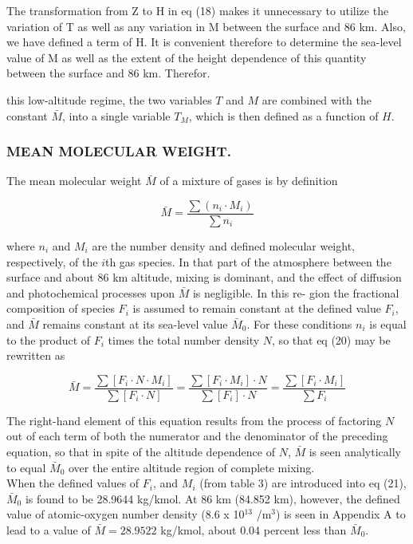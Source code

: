 \documentclass{article}
\begin{document}
The transformation from Z to H in eq (18) makes it unnecessary to utilize the variation of T as well as any variation in M between the surface and 86 km. Also, we have defined a term of H. It is convenient therefore to determine the sea-level value of M as well as the extent of the height dependence of this quantity between the surface and 86 km. Therefor.

\noindent this low-altitude regime, the two variables $T$ and $M$ are combined with the constant $\bar{M}$, into a single variable $T_M$, which is then defined as a function of $H$.

\subsubsection{MEAN MOLECULAR WEIGHT.}
The mean molecular weight $\bar{M}$ of a mixture of gases is by definition

\begin{equation}
 \bar{M} = \frac{\sum (n_i \cdot M_i)}{\sum n_i} \tag{20}
\end{equation}

where $n_i$ and $M_i$ are the number density and defined molecular weight, respectively, of the $i$th gas species. In that part of the atmosphere between the surface and about 86 km altitude, mixing is dominant, and the effect of diffusion and photochemical processes upon $\bar{M}$ is negligible. In this re- gion the fractional composition of species $F_i$ is assumed to remain constant at the defined value $F_i$, and $\bar{M}$ remains constant at its sea-level value $\bar{M}_0$. For these conditions $n_i$ is equal to the product of $F_i$ times the total number density $N$, so that eq (20) may be rewritten as

\begin{equation}
 \bar{M} = \frac{\sum [F_i \cdot N \cdot M_i]}{\sum [F_i \cdot N]} = \frac{\sum [F_i \cdot M_i] \cdot N}{\sum [F_i] \cdot N} = \frac{\sum [F_i \cdot M_i]}{\sum F_i} \tag{21}
\end{equation}

The right-hand element of this equation results from the process of factoring $N$ out of each term of both the numerator and the denominator of the preceding equation, so that in spite of the altitude dependence of $N$, $\bar{M}$ is seen analytically to equal $\bar{M}_0$ over the entire altitude region of complete mixing.\\

When the defined values of $F_i$, and $M_i$ (from table 3) are introduced into eq (21), $\bar{M}_0$ is found to be 28.9644 kg/kmol. At 86 km (84.852 km), however, the defined value of atomic-oxygen number density (8.6 x 10$^{13}$ /m$^3$) is seen in Appendix A to lead to a value of $\bar{M} = 28.9522$ kg/kmol, about 0.04 percent less than $\bar{M}_0$.\\
\end{document}
